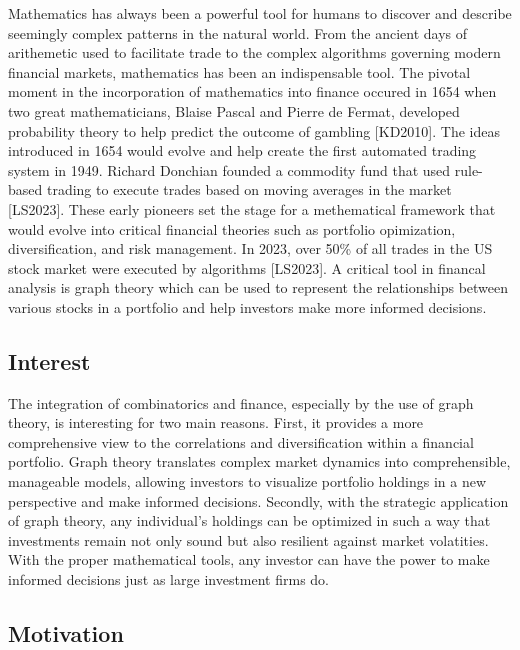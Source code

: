 \documentclass{article}
\begin{document}
Mathematics has always been a powerful tool for humans to discover and describe seemingly complex patterns in the natural world. From the ancient days of arithemetic used to facilitate trade to the complex algorithms governing modern financial markets, mathematics has been an indispensable tool. The pivotal moment in the incorporation of mathematics into finance occured in 1654 when two great mathematicians, Blaise Pascal and Pierre de Fermat, developed probability theory to help predict the outcome of gambling [KD2010]. The ideas introduced in 1654 would evolve and help create the first automated trading system in 1949. Richard Donchian founded a commodity fund that used rule-based trading to execute trades based on moving averages in the market [LS2023]. These early pioneers set the stage for a methematical framework that would evolve into critical financial theories such as portfolio opimization, diversification, and risk management. In 2023, over 50\% of all trades in the US stock market were executed by algorithms [LS2023]. A critical tool in financal analysis is graph theory which can be used to represent the relationships between various stocks in a portfolio and help investors make more informed decisions.


\subsection{Interest}

The integration of combinatorics and finance, especially by the use of graph theory, is interesting for two main reasons. First, it provides a more comprehensive view to the correlations and diversification within a financial portfolio. Graph theory translates complex market dynamics into comprehensible, manageable models, allowing investors to visualize portfolio holdings in a new perspective and make informed decisions. Secondly, with the strategic application of graph theory, any individual's holdings can be optimized in such a way that investments remain not only sound but also resilient against market volatities. With the proper mathematical tools, any investor can have the power to make informed decisions just as large investment firms do.

\subsection{Motivation}
\end{document}
